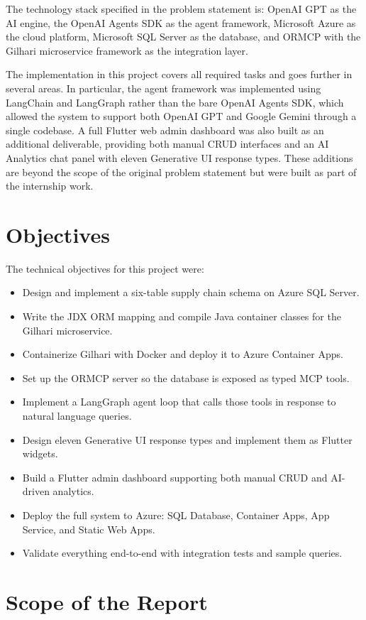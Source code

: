 \documentclass{book}
\begin{document}
The technology stack specified in the problem statement is: OpenAI GPT as the AI engine, the OpenAI Agents SDK as the agent framework, Microsoft Azure as the cloud platform, Microsoft SQL Server as the database, and ORMCP with the Gilhari microservice framework as the integration layer.

The implementation in this project covers all required tasks and goes further in several areas. In particular, the agent framework was implemented using LangChain and LangGraph rather than the bare OpenAI Agents SDK, which allowed the system to support both OpenAI GPT and Google Gemini through a single codebase. A full Flutter web admin dashboard was also built as an additional deliverable, providing both manual CRUD interfaces and an AI Analytics chat panel with eleven Generative UI response types. These additions are beyond the scope of the original problem statement but were built as part of the internship work.

\section{Objectives}

The technical objectives for this project were:
\begin{itemize}[itemsep=0pt]
\item Design and implement a six-table supply chain schema on Azure SQL Server.
\item Write the JDX ORM mapping and compile Java container classes for the Gilhari microservice.
\item Containerize Gilhari with Docker and deploy it to Azure Container Apps.
\item Set up the ORMCP server so the database is exposed as typed MCP tools.
\item Implement a LangGraph agent loop that calls those tools in response to natural language queries.
\item Design eleven Generative UI response types and implement them as Flutter widgets.
\item Build a Flutter admin dashboard supporting both manual CRUD and AI-driven analytics.
\item Deploy the full system to Azure: SQL Database, Container Apps, App Service, and Static Web Apps.
\item Validate everything end-to-end with integration tests and sample queries.
\end{itemize}

\section{Scope of the Report}
\end{document}
